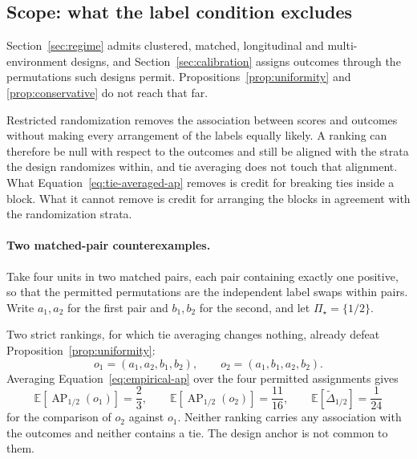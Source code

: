 \documentclass[11pt]{article}
\newcommand{\AP}{\operatorname{AP}}
\newcommand{\PSet}{\Pi_\star}
\newcommand{\E}{\mathbb{E}}
\newcommand{\Dta}{\widetilde{\Delta}}
\theoremstyle{remark}
\begin{document}
\subsection{Scope: what the label condition excludes}
\label{sec:paired-scope}

Section~\ref{sec:regime} admits clustered, matched, longitudinal and multi-environment designs, and Section~\ref{sec:calibration} assigns outcomes through the permutations such designs permit. Propositions~\ref{prop:uniformity} and \ref{prop:conservative} do not reach that far.

Restricted randomization removes the association between scores and outcomes without making every arrangement of the labels equally likely. A ranking can therefore be null with respect to the outcomes and still be aligned with the strata the design randomizes within, and tie averaging does not touch that alignment. What Equation~\eqref{eq:tie-averaged-ap} removes is credit for breaking ties inside a block. What it cannot remove is credit for arranging the blocks in agreement with the randomization strata.

\paragraph{Two matched-pair counterexamples.}
Take four units in two matched pairs, each pair containing exactly one positive, so that the permitted permutations are the independent label swaps within pairs. Write $a_1,a_2$ for the first pair and $b_1,b_2$ for the second, and let $\PSet=\{1/2\}$.

Two strict rankings, for which tie averaging changes nothing, already defeat Proposition~\ref{prop:uniformity}:
\[
o_1=(a_1,a_2,b_1,b_2),
\qquad
o_2=(a_1,b_1,a_2,b_2).
\]
Averaging Equation~\eqref{eq:empirical-ap} over the four permitted assignments gives
\[
\E\left[\AP_{1/2}(o_1)\right]=\frac23,
\qquad
\E\left[\AP_{1/2}(o_2)\right]=\frac{11}{16},
\qquad
\E\left[\Dta_{1/2}\right]=\frac{1}{24}
\]
for the comparison of $o_2$ against $o_1$. Neither ranking carries any association with the outcomes and neither contains a tie. The design anchor is not common to them.
\end{document}
